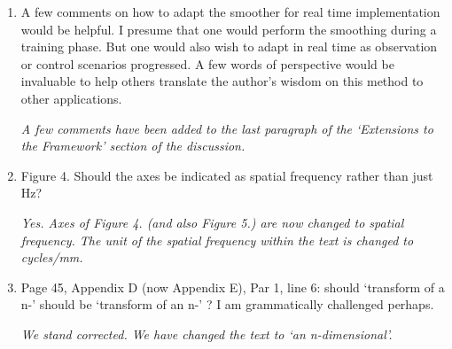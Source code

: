 \documentclass{article}
\begin{document}
\begin{enumerate}
\item A few comments on how to adapt the smoother for real time implementation would be helpful. I presume that one would perform the smoothing during a training phase. But one would also wish to adapt in real time as observation or control scenarios progressed. A few words of perspective would be invaluable to help others translate the author's wisdom on this method to other applications.

\emph{A few comments have been added to the last paragraph of the `Extensions to the Framework' section of the discussion.}

\item Figure 4. Should the axes be indicated as spatial frequency rather than just Hz?

\emph{Yes. Axes of Figure 4. (and also Figure 5.) are now changed to spatial frequency. The unit of the spatial frequency within the text is changed to cycles/mm.}

\item Page 45, Appendix D (now Appendix E), Par 1, line 6: should `transform of a n-' should be `transform of an n-' ? I am grammatically challenged perhaps.

\emph{We stand corrected. We have changed the text to `an n-dimensional'.}

\end{enumerate}
\end{document}
